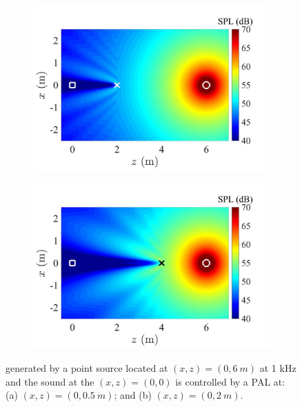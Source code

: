 \begin{figure}[!htb]
    \centering
    \begin{subfigure}{0.49\textwidth}
        \centering
        \includegraphics[width = 1\textwidth]{fig/cal_ANC_demo_On_1kHz_SecPAL_dse2m_resize.jpg}
        \caption{}
    \end{subfigure}
    \begin{subfigure}{0.49\textwidth}
        \centering
        \includegraphics[width = 1\textwidth]{fig/cal_ANC_demo_On_1kHz_SecPAL_dse4m_resize.jpg}
        \caption{}
    \end{subfigure}
    \caption{
         generated by a point source located at $(x,z) = (0,\SI{6}{m})$ at 1 kHz and the sound at the $(x,z) = (0,0)$ is controlled by a PAL at: (a) $(x,z) = (0, \SI{0.5}{m})$; and (b) $(x,z) = (0,\SI{2}{m})$. 
    }
    \label{fig:anc_change_dist_pal}
\end{figure}


